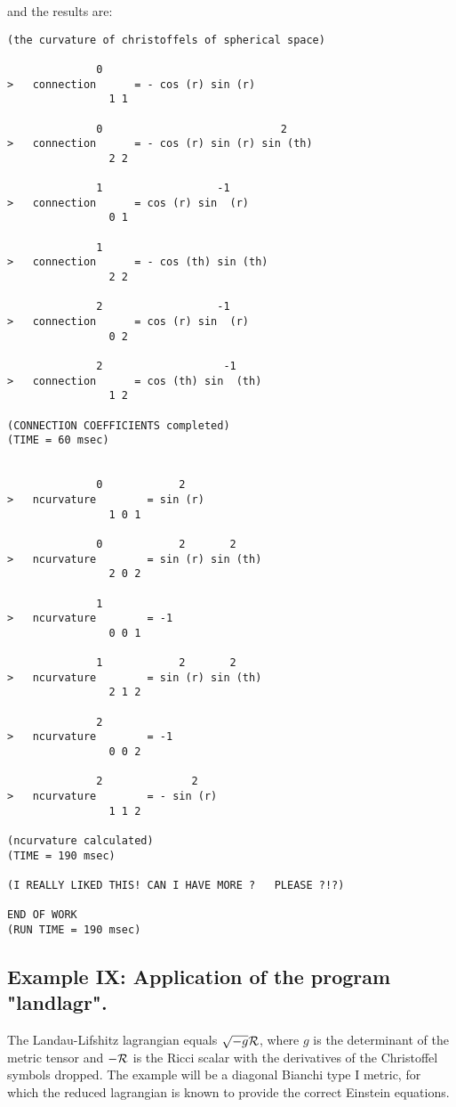 \bigskip

\noindent and the results are:

\bigskip

\begin{verbatim}
(the curvature of christoffels of spherical space)

              0
>   connection      = - cos (r) sin (r)
                1 1

              0                            2
>   connection      = - cos (r) sin (r) sin (th)
                2 2

              1                  -1
>   connection      = cos (r) sin  (r)
                0 1

              1
>   connection      = - cos (th) sin (th)
                2 2

              2                  -1
>   connection      = cos (r) sin  (r)
                0 2

              2                   -1
>   connection      = cos (th) sin  (th)
                1 2

(CONNECTION COEFFICIENTS completed)
(TIME = 60 msec)


              0            2
>   ncurvature        = sin (r)
                1 0 1

              0            2       2
>   ncurvature        = sin (r) sin (th)
                2 0 2

              1
>   ncurvature        = -1
                0 0 1

              1            2       2
>   ncurvature        = sin (r) sin (th)
                2 1 2

              2
>   ncurvature        = -1
                0 0 2

              2              2
>   ncurvature        = - sin (r)
                1 1 2

(ncurvature calculated)
(TIME = 190 msec)

(I REALLY LIKED THIS! CAN I HAVE MORE ?   PLEASE ?!?)

END OF WORK
(RUN TIME = 190 msec)
\end{verbatim}

\bigskip

\subsection{Example IX: Application of the program "landlagr".}

The Landau-Lifshitz lagrangian equals $\sqrt{- g} \cal{R}$, where $g$ is the
determinant of the metric tensor and $- \cal{R}$ is the Ricci scalar with the
derivatives of the Christoffel symbols dropped. The example will be a diagonal
Bianchi type I metric, for which the reduced lagrangian is known to provide the
correct Einstein equations.

